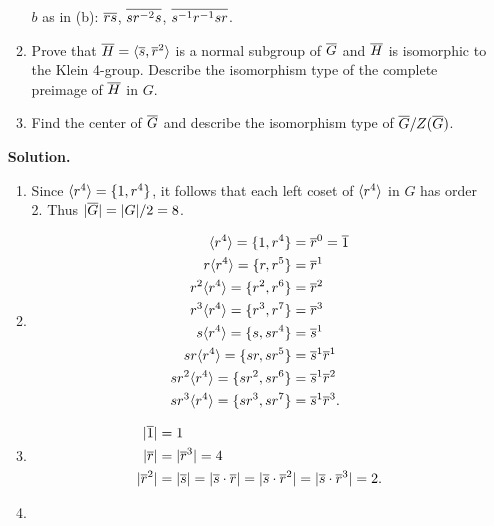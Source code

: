 \begin{enumerate}
\begin{enumerate}
                           $b$ as in (b): \quad $\overline{rs}$, \quad $\overline{sr^{-2}s}$,
                           \quad $\overline{s^{-1}r^{-1}sr}$.
                     \item Prove that $\overline{H} = \langle \overline{s}, \overline{r}^2 \rangle$ is a normal
                           subgroup of $\overline{G}$ and $\overline{H}$ is isomorphic to the
                           Klein 4-group. Describe the isomorphism type of the
                           complete preimage of $\overline{H}$ in $G$.
                     \item Find the center of $\overline{G}$ and describe the
                           isomorphism type of $\overline{G}/Z(\overline{G})$.
                  \end{enumerate}

      \textbf{Solution.}

      \begin{enumerate}
         \item Since $\langle r^4 \rangle = \{1, r^4\}$, it follows that each left coset
               of $\langle r^4 \rangle$ in $G$ has order 2. Thus $|\overline{G}| = |G|/2 = 8$.
         \item \begin{align*}
                  \langle r^4 \rangle = \{1, r^4\} &= \overline{r}^0 = \overline{1} \\
                  r\langle r^4 \rangle = \{r, r^5\} &= \overline{r}^1 \\
                  r^2\langle r^4 \rangle = \{r^2, r^6\} &= \overline{r}^2 \\
                  r^3\langle r^4 \rangle = \{r^3, r^7\} &= \overline{r}^3 \\
                  s\langle r^4 \rangle = \{s, sr^4\} &= \overline{s}^1 \\
                  sr\langle r^4 \rangle = \{sr, sr^5\} &= \overline{s}^1\overline{r}^1 \\
                  sr^2\langle r^4 \rangle = \{sr^2, sr^6\} &= \overline{s}^1\overline{r}^2 \\
                  sr^3\langle r^4 \rangle = \{sr^3, sr^7\} &= \overline{s}^1\overline{r}^3.
               \end{align*}
         \item \begin{align*}
                  |\overline{1}| &= 1 \\
                  |\overline{r}| &= |\overline{r}^3| = 4 \\
                  |\overline{r}^2|&= |\overline{s}| = |\overline{s}\cdot\overline{r}| =
                  |\overline{s}\cdot\overline{r}^2| = |\overline{s}\cdot\overline{r}^3| = 2.
               \end{align*}
         \item \begin{align*}

\end{align*}
\end{enumerate}
\end{enumerate}
